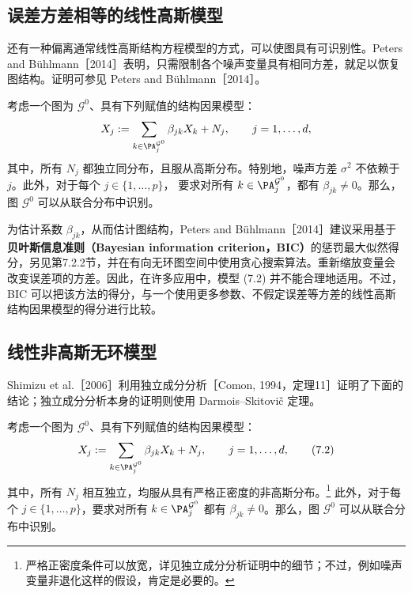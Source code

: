 \subsection{误差方差相等的线性高斯模型}

还有一种偏离通常线性高斯结构方程模型的方式，可以使图具有可识别性。Peters and Bühlmann［2014］表明，只需限制各个噪声变量具有相同方差，就足以恢复图结构。证明可参见 Peters and Bühlmann［2014］。

\begin{proposition}[误差方差相等时的可识别性]
考虑一个图为 $\mathcal G^0$、具有下列赋值的结构因果模型：
\[
 X_j:=\sum_{k\in\PA_j^{\mathcal G^0}}\beta_{jk}X_k+N_j,
 \qquad j=1,\ldots,d,
\]
其中，所有 $N_j$ 都独立同分布，且服从高斯分布。特别地，噪声方差 $\sigma^2$ 不依赖于 $j$。此外，对于每个 $j\in\{1,\ldots,p\}$，
要求对所有 $k\in\PA_j^{\mathcal G^0}$，都有 $\beta_{jk}\neq0$。那么，图 $\mathcal G^0$ 可以从联合分布中识别。
\end{proposition}

为估计系数 $\beta_{jk}$，从而估计图结构，Peters and Bühlmann［2014］建议采用基于\textbf{贝叶斯信息准则（Bayesian information criterion，BIC）}的惩罚最大似然得分，另见第7.2.2节，并在有向无环图空间中使用贪心搜索算法。重新缩放变量会改变误差项的方差。因此，在许多应用中，模型 (7.2) 并不能合理地适用。不过，BIC 可以把该方法的得分，与一个使用更多参数、不假定误差等方差的线性高斯结构因果模型的得分进行比较。

\subsection{线性非高斯无环模型}

Shimizu et al.［2006］利用独立成分分析［Comon, 1994，定理11］证明了下面的结论；独立成分分析本身的证明则使用 Darmois--Skitovič 定理。

\begin{theorem}[LiNGAM的可识别性]
考虑一个图为 $\mathcal G^0$、具有下列赋值的结构因果模型：
\begin{equation}
 X_j:=\sum_{k\in\PA_j^{\mathcal G^0}}\beta_{jk}X_k+N_j,
 \qquad j=1,\ldots,d,
 \tag{7.2}
\end{equation}
其中，所有 $N_j$ 相互独立，均服从具有严格正密度的非高斯分布。\footnote{严格正密度条件可以放宽，详见独立成分分析证明中的细节；不过，例如噪声变量非退化这样的假设，肯定是必要的。}
此外，对于每个 $j\in\{1,\ldots,p\}$，要求对所有 $k\in\PA_j^{\mathcal G^0}$ 都有 $\beta_{jk}\neq0$。那么，图 $\mathcal G^0$ 可以从联合分布中识别。
\end{theorem}

